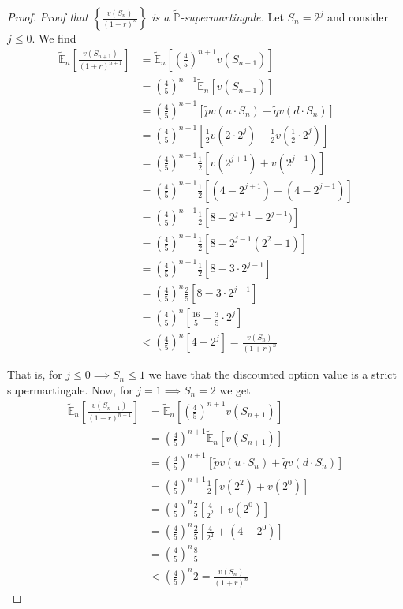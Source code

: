 \documentclass[12pt]{article}
\newlength\tindent
\renewcommand{\indent}{\hspace*{\tindent}}
\renewcommand{\P}{\mathbb P}
\newcommand{\E}{\mathbb E}
\begin{document}
\begin{proof} {\em Proof that $\left\{ \frac{v(S_n)}{(1 + r)^n} \right\} $ is a $\tilde{\P}$-supermartingale.} Let $S_n = 2^j$ and consider $j \leq 0$. We find
\begin{align*}
	\tilde{\E}_n \left[ \frac{ v(S_{n + 1}) }{ (1 + r)^{n + 1} } \right] &= \tilde{\E}_n \left[ \left( \frac{4}{5} \right)^{n + 1} v(S_{n + 1}) \right] \\
	&= \left( \frac{4}{5} \right)^{n + 1} \tilde{\E}_n \left[ v(S_{n + 1}) \right] \\
	&= \left( \frac{4}{5} \right)^{n + 1} \left[ \tilde{p} v(u \cdot S_n) + \tilde{q} v(d \cdot S_n) \right] \\
	&= \left( \frac{4}{5} \right)^{n + 1} \left[ \frac{1}{2} v(2\cdot 2^j) + \frac{1}{2} v \left( \frac{1}{2} \cdot 2^j \right) \right] \\
	&= \left( \frac{4}{5} \right)^{n + 1} \frac{1}{2} \left[ v(2^{j + 1}) + v \left( 2^{j - 1} \right) \right] \\
	&= \left( \frac{4}{5} \right)^{n + 1} \frac{1}{2} \left[ (4 - 2^{j + 1}) + (4 - 2^{j - 1}) \right] \\
	&= \left( \frac{4}{5} \right)^{n + 1} \frac{1}{2} \left[ 8 - 2^{j + 1} - 2^{j - 1}) \right] \\
	&= \left( \frac{4}{5} \right)^{n + 1} \frac{1}{2} \left[ 8 - 2^{j - 1}(2^2 - 1) \right] \\
	&= \left( \frac{4}{5} \right)^{n + 1} \frac{1}{2} \left[ 8 - 3\cdot 2^{j - 1} \right] \\
	&= \left( \frac{4}{5} \right)^n \frac{2}{5} \left[ 8 - 3\cdot 2^{j - 1} \right] \\
	&= \left( \frac{4}{5} \right)^n \left[ \frac{16}{5} - \frac{3}{5} \cdot 2^j \right] \\
	&< \left( \frac{4}{5} \right)^n [4 - 2^j] = \frac{ v(S_n) }{ (1 + r)^n }
\end{align*}

\indent That is, for $j \leq 0 \implies S_n \leq 1$ we have that the discounted option value is a strict supermartingale. Now, for $j = 1 \implies S_n = 2$ we get
\begin{align*}
	\tilde{\E}_n \left[ \frac{ v(S_{n + 1}) }{ (1 + r)^{n + 1} } \right] &= \tilde{\E}_n \left[ \left( \frac{4}{5} \right)^{n + 1} v(S_{n + 1}) \right] \\
	&= \left( \frac{4}{5} \right)^{n + 1} \tilde{\E}_n \left[ v(S_{n + 1}) \right] \\
	&= \left( \frac{4}{5} \right)^{n + 1} \left[ \tilde{p} v(u \cdot S_n) + \tilde{q} v(d \cdot S_n) \right] \\
	&= \left( \frac{4}{5} \right)^{n + 1} \frac{1}{2} \left[ v(2^2) + v(2^0) \right] \\
	&= \left( \frac{4}{5} \right)^n \frac{2}{5} \left[ \frac{4}{2^2} + v(2^0) \right] \\
	&= \left( \frac{4}{5} \right)^n \frac{2}{5} \left[ \frac{4}{2^2} + (4 - 2^0) \right] \\
	&= \left( \frac{4}{5} \right)^n \frac{8}{5} \\
	&< \left( \frac{4}{5} \right)^n 2 = \frac{ v(S_n) }{ (1 + r)^n }
\end{align*}


\end{proof}
\end{document}
